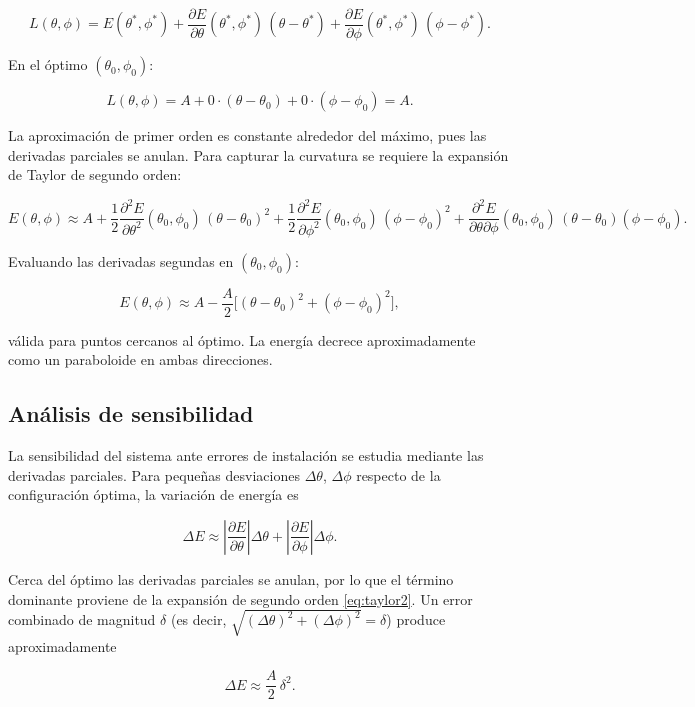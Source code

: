 \documentclass[12pt,a4paper]{article}
\begin{document}
\[
L(\theta,\phi)=E(\theta^*,\phi^*)
+\frac{\partial E}{\partial\theta}(\theta^*,\phi^*)\,(\theta-\theta^*)
+\frac{\partial E}{\partial\phi}(\theta^*,\phi^*)\,(\phi-\phi^*).
\]

En el óptimo $(\theta_0,\phi_0)$:

\[
L(\theta,\phi)=A + 0\cdot(\theta-\theta_0) + 0\cdot(\phi-\phi_0)=A.
\]

La aproximación de primer orden es constante alrededor del máximo, pues las derivadas parciales se anulan. Para capturar la curvatura se requiere la expansión de Taylor de segundo orden:

\[
E(\theta,\phi)\approx A
+\frac12\frac{\partial^2 E}{\partial\theta^2}(\theta_0,\phi_0)\,(\theta-\theta_0)^2
+\frac12\frac{\partial^2 E}{\partial\phi^2}(\theta_0,\phi_0)\,(\phi-\phi_0)^2
+\frac{\partial^2 E}{\partial\theta\partial\phi}(\theta_0,\phi_0)\,(\theta-\theta_0)(\phi-\phi_0).
\]

Evaluando las derivadas segundas en $(\theta_0,\phi_0)$:

\begin{equation}\label{eq:taylor2}
E(\theta,\phi)\approx A-\frac{A}{2}\big[(\theta-\theta_0)^2+(\phi-\phi_0)^2\big],
\end{equation}

válida para puntos cercanos al óptimo. La energía decrece aproximadamente como un paraboloide en ambas direcciones.

\subsection{Análisis de sensibilidad}

La sensibilidad del sistema ante errores de instalación se estudia mediante las derivadas parciales. Para pequeñas desviaciones $\Delta\theta$, $\Delta\phi$ respecto de la configuración óptima, la variación de energía es

\[
\Delta E \approx \left|\frac{\partial E}{\partial\theta}\right|\Delta\theta
+ \left|\frac{\partial E}{\partial\phi}\right|\Delta\phi.
\]

Cerca del óptimo las derivadas parciales se anulan, por lo que el término dominante proviene de la expansión de segundo orden \eqref{eq:taylor2}. Un error combinado de magnitud $\delta$ (es decir, $\sqrt{(\Delta\theta)^2+(\Delta\phi)^2}=\delta$) produce aproximadamente

\begin{equation}\label{eq:sens}
\Delta E \approx \frac{A}{2}\,\delta^2.
\end{equation}
\end{document}
